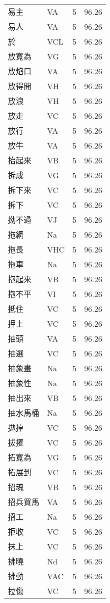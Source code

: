 \documentclass[twocolumn]{book}
\begin{document}
\begin{supertabular}{llrr}
易主 & VA & 5 &  96.26\\
易人 & VA & 5 &  96.26\\
於 & VCL & 5 &  96.26\\
放寬為 & VG & 5 &  96.26\\
放焰口 & VA & 5 &  96.26\\
放得開 & VH & 5 &  96.26\\
放浪 & VH & 5 &  96.26\\
放走 & VC & 5 &  96.26\\
放行 & VA & 5 &  96.26\\
放牛 & VA & 5 &  96.26\\
抬起來 & VB & 5 &  96.26\\
拆成 & VG & 5 &  96.26\\
拆下來 & VC & 5 &  96.26\\
拆下 & VC & 5 &  96.26\\
拗不過 & VJ & 5 &  96.26\\
拖網 & Na & 5 &  96.26\\
拖長 & VHC & 5 &  96.26\\
拖車 & Na & 5 &  96.26\\
抱起來 & VB & 5 &  96.26\\
抱不平 & VI & 5 &  96.26\\
抵住 & VC & 5 &  96.26\\
押上 & VC & 5 &  96.26\\
抽頭 & VA & 5 &  96.26\\
抽選 & VC & 5 &  96.26\\
抽象畫 & Na & 5 &  96.26\\
抽象性 & Na & 5 &  96.26\\
抽出來 & VB & 5 &  96.26\\
抽水馬桶 & Na & 5 &  96.26\\
拋掉 & VC & 5 &  96.26\\
拔擢 & VC & 5 &  96.26\\
拓寬為 & VG & 5 &  96.26\\
拓展到 & VC & 5 &  96.26\\
招魂 & VB & 5 &  96.26\\
招兵買馬 & VA & 5 &  96.26\\
招工 & Na & 5 &  96.26\\
拒收 & VC & 5 &  96.26\\
抹上 & VC & 5 &  96.26\\
拂曉 & Nd & 5 &  96.26\\
拂動 & VAC & 5 &  96.26\\
拉傷 & VC & 5 &  96.26\\

\end{supertabular}
\end{document}
